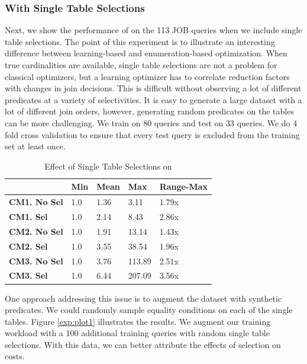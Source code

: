 \subsubsection{With Single Table Selections}
Next, we show the performance of \sys on the 113 JOB queries when we include single table selections. The point of this experiment is to illustrate an interesting difference between learning-based and enumeration-based optimization. When true cardinalities are available, single table selections are not a problem for classical optimizers, but a learning optimizer has to correlate reduction factors with changes in join decisions. This is difficult without observing a lot of different predicates at a variety of selectivities.
It is easy to generate a large dataset with a lot of different join orders, however, generating random predicates on the tables can be more challenging. We train on 80 queries and test on 33 queries. We do 4 fold cross validation to ensure that every test query is excluded from the training set at least once. 

\begin{table}[ht!]\centering \small
\caption{Effect of Single Table Selections on \sys }\vspace{0.25em}
\begin{tabular}{|l|l|l|l|l|}\hline
    & {\bf Min}  & {\bf Mean}  & {\bf Max}    & {\bf Range-Max} \\ \hline
{\bf CM1. No Sel}  & 1.0  & 1.36   & 3.11    & 1.79x\\ \hline
{\bf CM1. Sel}  & 1.0  & 2.14   & 8.43    & 2.86x\\ \hline
{\bf CM2. No Sel}  & 1.0  & 1.91   & 13.14    & 1.43x\\ \hline
{\bf CM2. Sel}  & 1.0  & 3.55   & 38.54    & 1.96x\\ \hline
{\bf CM3. No Sel}  & 1.0  & 3.76   & 113.89    & 2.51x\\ \hline
{\bf CM3. Sel}  & 1.0  & 6.44   & 207.09    & 3.56x\\ \hline
\end{tabular}
\end{table}

One approach addressing this issue is to augment the dataset with synthetic predicates. We could randomly sample equality conditions on each of the single tables. Figure \ref{exp:plot1} illustrates the results. We augment our training workload with a 100 additional training queries with random single table selections. With this data, we can better attribute the effects of selection on costs.   

